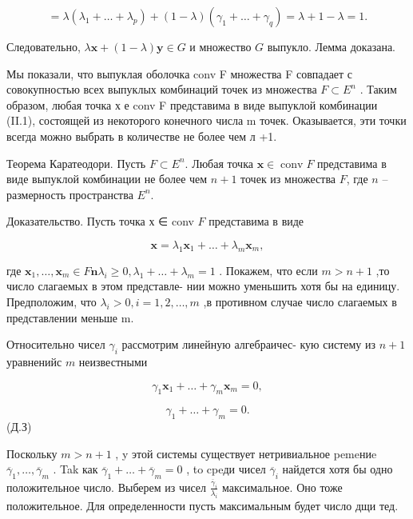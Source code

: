 \documentclass[8pt]{extarticle}
\begin{document}
\[
= \lambda \left( {{\lambda }_{1} + \ldots  + {\lambda }_{p}}\right)  + \left( {1 - \lambda }\right) \left( {{\gamma }_{1} + \ldots  + {\gamma }_{q}}\right)  = \lambda  + 1 - \lambda  = 1.
\]

Следовательно, \(\lambda \mathbf{x} + \left( {1 - \lambda }\right) \mathbf{y} \in  G\) и множество \(G\) выпукло. Лемма доказана.

Мы показали, что выпуклая оболочка conv F множества F совпадает с совокупностью всех выпуклых комбинаций точек из множества \(F \subset  {E}^{n}\) . Таким образом, любая точка х е conv F представима в виде выпуклой комбинации (II.1), состоящей из некоторого конечного числа m точек. Оказывается, эти точки всегда можно выбрать в количестве не более чем л +1.

Теорема Каратеодори. Пусть \(F \subset E^{n}\). Любая точка \(\mathbf{x} \in \operatorname{conv} F\) представима в виде выпуклой комбинации не более чем \(n + 1\) точек из множества \(F\), где \(n\) -- размерность пространства \(E^{n}\).

Доказательство. Пусть точка х ∈ conv \(F\) представима в виде

\[
\mathbf{x} = {\lambda }_{1}{\mathbf{x}}_{1} + \ldots  + {\lambda }_{m}{\mathbf{x}}_{m},
\]

где \({\mathbf{x}}_{1},\ldots ,{\mathbf{x}}_{m} \in  F\mathbf{n}{\lambda }_{i} \geq  0,{\lambda }_{1} + \ldots  + {\lambda }_{m} = 1\) . Покажем, что если \(m > n + 1\) ,то число слагаемых в этом представле- нии можно уменьшить хотя бы на единицу. Предположим, что \({\lambda }_{i} > 0,i = 1,2,\ldots ,m\) ,в противном случае число слагаемых в представлении меньше m.

Относительно чисел \({\gamma }_{i}\) рассмотрим линейную алгебраичес- кую систему из \(n + 1\) уравненийс \(m\) неизвестными

\[
{\gamma }_{1}{\mathbf{x}}_{1} + \ldots  + {\gamma }_{m}{\mathbf{x}}_{m} = 0, \tag{II.2}
\]

\[
{\gamma }_{1} + \ldots  + {\gamma }_{m} = 0.
\]
 (Д.З)

Поскольку \(m > n + 1\) , y этой системы существует нетривиальное pemeниe \({\overline{\gamma }}_{1},\ldots ,{\overline{\gamma }}_{m}\) . Tak как \({\overline{\gamma }}_{1} + \ldots  + {\overline{\gamma }}_{m} = 0\) , to cpeди чисел \({\overline{\gamma }}_{i}\) найдется хотя бы одно положительное число. Выберем из чисел \(\frac{{\overline{\gamma }}_{i}}{{\lambda }_{i}}\) максимальное. Оно тоже положительное. Для определенности пусть максимальным будет число дщи тед.
\end{document}
